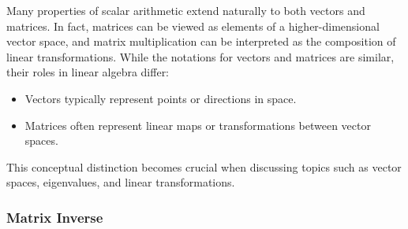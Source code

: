 \documentclass[../readings.tex]{subfiles}
\begin{document}

Many properties of scalar arithmetic extend naturally to both vectors and matrices. In fact, matrices can be viewed as elements of a higher-dimensional vector space, and matrix multiplication can be interpreted as the composition of linear transformations. While the notations for vectors and matrices are similar, their roles in linear algebra differ:
\begin{itemize}
    \item Vectors typically represent points or directions in space.
    \item Matrices often represent linear maps or transformations between vector spaces.
\end{itemize}
This conceptual distinction becomes crucial when discussing topics such as vector spaces, eigenvalues, and linear transformations.
\newpage

\subsubsection{Matrix Inverse}
\end{document}
